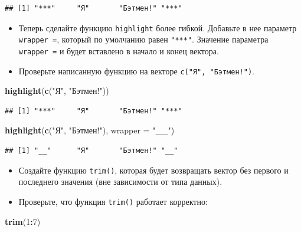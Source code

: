 \documentclass[]{book}
\newenvironment{Shaded}{\begin{snugshade}}{\end{snugshade}}
\newcommand{\KeywordTok}[1]{\textcolor[rgb]{0.13,0.29,0.53}{\textbf{#1}}}
\newcommand{\DataTypeTok}[1]{\textcolor[rgb]{0.13,0.29,0.53}{#1}}
\newcommand{\DecValTok}[1]{\textcolor[rgb]{0.00,0.00,0.81}{#1}}
\newcommand{\StringTok}[1]{\textcolor[rgb]{0.31,0.60,0.02}{#1}}
\newcommand{\OperatorTok}[1]{\textcolor[rgb]{0.81,0.36,0.00}{\textbf{#1}}}
\newcommand{\NormalTok}[1]{#1}
\begin{document}
\begin{verbatim}
## [1] "***"     "Я"       "Бэтмен!" "***"
\end{verbatim}

\begin{itemize}
\item
  Теперь сделайте функцию \texttt{highlight} более гибкой. Добавьте в
  нее параметр \texttt{wrapper\ =}, который по умолчанию равен
  \texttt{"***"}. Значение параметра \texttt{wrapper\ =} и будет
  вставлено в начало и конец вектора.
\item
  Проверьте написанную функцию на векторе \texttt{c("Я",\ "Бэтмен!")}.
\end{itemize}

\begin{Shaded}
\begin{Highlighting}[]
\KeywordTok{highlight}\NormalTok{(}\KeywordTok{c}\NormalTok{(}\StringTok{"Я"}\NormalTok{, }\StringTok{"Бэтмен!"}\NormalTok{)) }
\end{Highlighting}
\end{Shaded}

\begin{verbatim}
## [1] "***"     "Я"       "Бэтмен!" "***"
\end{verbatim}

\begin{Shaded}
\begin{Highlighting}[]
\KeywordTok{highlight}\NormalTok{(}\KeywordTok{c}\NormalTok{(}\StringTok{"Я"}\NormalTok{, }\StringTok{"Бэтмен!"}\NormalTok{), }\DataTypeTok{wrapper =} \StringTok{"__"}\NormalTok{) }
\end{Highlighting}
\end{Shaded}

\begin{verbatim}
## [1] "__"      "Я"       "Бэтмен!" "__"
\end{verbatim}

\begin{itemize}
\item
  Создайте функцию \texttt{trim()}, которая будет возвращать вектор без
  первого и последнего значения (вне зависимости от типа данных).
\item
  Проверьте, что функция \texttt{trim()} работает корректно:
\end{itemize}

\begin{Shaded}
\begin{Highlighting}[]
\KeywordTok{trim}\NormalTok{(}\DecValTok{1}\OperatorTok{:}\DecValTok{7}\NormalTok{)}
\end{Highlighting}
\end{Shaded}
\end{document}
